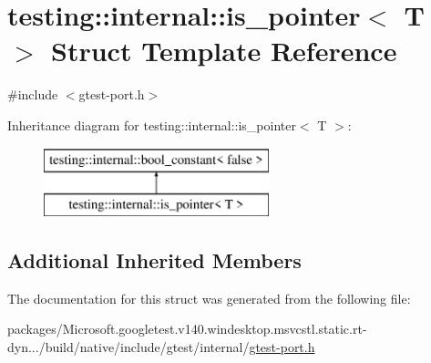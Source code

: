 \hypertarget{structtesting_1_1internal_1_1is__pointer}{}\section{testing\+::internal\+::is\+\_\+pointer$<$ T $>$ Struct Template Reference}
\label{structtesting_1_1internal_1_1is__pointer}


{\ttfamily \#include $<$gtest-\/port.\+h$>$}

Inheritance diagram for testing\+::internal\+::is\+\_\+pointer$<$ T $>$\+:\begin{figure}[H]
\begin{center}
\leavevmode
\includegraphics[height=2.000000cm]{structtesting_1_1internal_1_1is__pointer}
\end{center}
\end{figure}
\subsection*{Additional Inherited Members}


The documentation for this struct was generated from the following file\+:\begin{DoxyCompactItemize}
\item 
packages/\+Microsoft.\+googletest.\+v140.\+windesktop.\+msvcstl.\+static.\+rt-\/dyn.../build/native/include/gtest/internal/\mbox{\hyperlink{gtest-port_8h}{gtest-\/port.\+h}}\end{DoxyCompactItemize}
